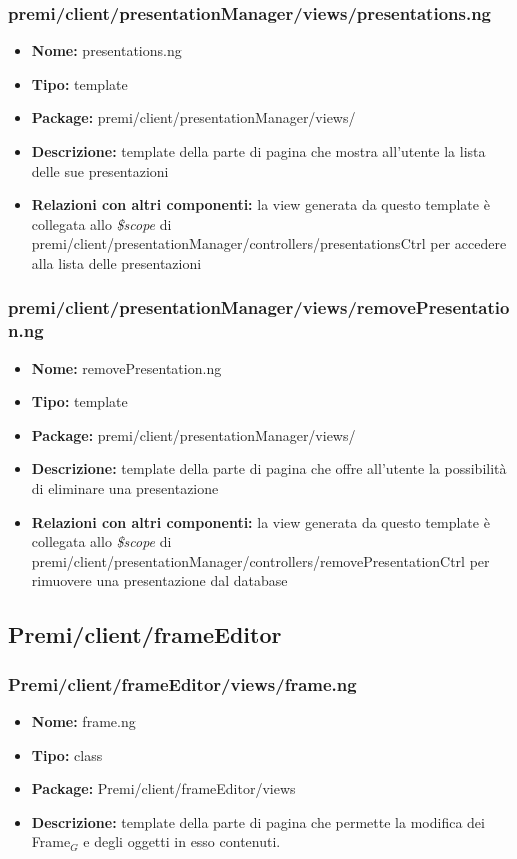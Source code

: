 \subsubsection{premi/client/presentationManager/views/presentations.ng}
\begin{itemize}
  \item[] \textbf{Nome:} presentations.ng
  \item[] \textbf{Tipo:} template
  \item[] \textbf{Package:} premi/client/presentationManager/views/
  \item[] \textbf{Descrizione:} template della parte di pagina che mostra all'utente la lista delle sue presentazioni
  \item[] \textbf{Relazioni con altri componenti:} la view generata da questo template è collegata allo \textit{\$scope} di premi/client/presentationManager/controllers/presentationsCtrl per accedere alla lista delle presentazioni
\end{itemize}

\subsubsection{premi/client/presentationManager/views/removePresentation.ng}
\begin{itemize}
  \item[] \textbf{Nome:} removePresentation.ng
  \item[] \textbf{Tipo:} template 
  \item[] \textbf{Package:} premi/client/presentationManager/views/
  \item[] \textbf{Descrizione:} template della parte di pagina che offre all'utente la possibilità di eliminare una presentazione 
  \item[] \textbf{Relazioni con altri componenti:} la view generata da questo template è collegata allo \textit{\$scope} di premi/client/presentationManager/controllers/removePresentationCtrl per rimuovere una presentazione dal database
\end{itemize}

\subsection{Premi/client/frameEditor}
\subsubsection{Premi/client/frameEditor/views/frame.ng}
\begin{itemize}
  \item[] \textbf{Nome:} frame.ng
  \item[] \textbf{Tipo:} class
  \item[] \textbf{Package:} Premi/client/frameEditor/views
  \item[] \textbf{Descrizione:} template della parte di pagina che permette la modifica dei Frame$_G$ e degli oggetti in esso contenuti.
\end{itemize}
